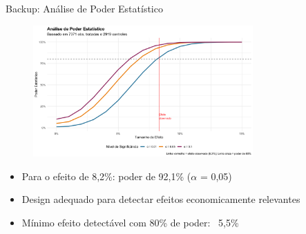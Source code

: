 \documentclass[10pt,aspectratio=169]{beamer}
\begin{document}
\appendix

\begin{frame}{Backup: Análise de Poder Estatístico}
\begin{figure}
\centering
\includegraphics[width=0.75\textwidth]{../../../data/outputs/additional_figures/power_analysis_simulation.png}
\end{figure}

\begin{itemize}
    \item Para o efeito de 8,2\%: poder de 92,1\% ($\alpha$ = 0,05)
    \item Design adequado para detectar efeitos economicamente relevantes
    \item Mínimo efeito detectável com 80\% de poder: ~5,5\%
\end{itemize}
\end{frame}
\end{document}
